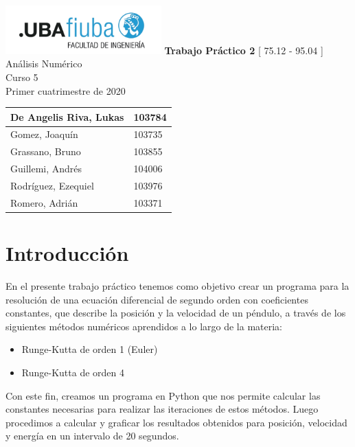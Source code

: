 \documentclass[titlepage,a4paper]{article}
\begin{document}
\begin{titlepage} %
	\hfill\includegraphics[width=6cm]{logofiuba.jpg}
    \centering
    \vfill
    \Huge \textbf{Trabajo Práctico 2}
    \vskip2cm
    \Large [ 75.12 - 95.04 ] Análisis Numérico\\
    Curso 5 \\ 
    Primer cuatrimestre de 2020\\
    \vfill
    \begin{tabular}{ | l | l | } 
      \hline
        De Angelis Riva, Lukas & 103784 \\ \hline
        Gomez, Joaquín & 103735 \\ \hline
        Grassano, Bruno & 103855 \\ \hline
        Guillemi, Andrés & 104006\\ \hline 
        Rodríguez, Ezequiel & 103976 \\ \hline
        Romero, Adrián & 103371 \\ \hline
  	\end{tabular}
    \vfill
    \vfill
    \vfill
\end{titlepage}

\tableofcontents %
\newpage

\section{Introducción}\label{sec:intro}
    En el presente trabajo práctico tenemos como objetivo crear un programa para la resolución de una ecuación diferencial de segundo orden con coeficientes constantes, que describe la posición y la velocidad de un péndulo, a través de los siguientes métodos numéricos aprendidos a lo largo de la materia:
    \begin{itemize}
        \item Runge-Kutta de orden 1 (Euler)
        \item Runge-Kutta de orden 4
    \end{itemize}
    
    Con este fin, creamos un programa en Python que nos permite calcular las constantes necesarias para realizar las iteraciones de estos métodos. Luego procedimos a calcular y graficar los resultados obtenidos para posición, velocidad y energía en un intervalo de 20 segundos.
\end{document}

